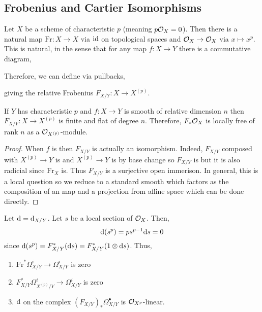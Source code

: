 \documentclass[12pt]{article}
\begin{document}
\subsection{Frobenius and Cartier Isomorphisms}

\newcommand{\Fr}{\mathrm{Fr}}

\begin{defn}
Let $X$ be a scheme of characteristic $p$ (meaning $p \mathcal{O}_{X} = 0$). Then there is a natural map $\Fr : X \to X$ via $\mathrm{id}$ on topological spaces and $\mathcal{O}_{X} \to \mathcal{O}_{X}$ via $x \mapsto x^p$. This is natural, in the sense that for any map $f : X \to Y$ there is a commutative diagram,
\begin{center}
\end{center}
Therefore, we can define via pullbacks,
\begin{center}
\end{center}
giving the relative Frobenius $F_{X/Y} : X \to X^{(p)}$. 
\end{defn}

\begin{prop}
If $Y$ has characteristic $p$ and $f : X \to Y$ is smooth of relative dimension $n$ then $F_{X/Y} : X \to X^{(p)}$ is finite and flat of degree $n$. Therefore, $F_* \mathcal{O}_{X}$ is locally free of rank $n$ as a $\mathcal{O}_{X^{(p)}}$-module.
\end{prop}

\begin{proof}
When $f$ is \etale then $F_{X/Y}$ is actually an isomorphism. Indeed, $F_{X/Y}$ composed with $X^{(p)} \to Y$ is \etale and $X^{(p)} \to Y$ is \etale by base change so $F_{X/Y}$ is \etale but it is also radicial since $\Fr_X$ is. Thus $F_{X/Y}$ is a surjective open immerison. In general, this is a local question so we reduce to a standard smooth which factors as the composition of an \etale map and a projection from affine space which can be done directly.
\end{proof}

\begin{prop}
Let $\mathrm{d} = \mathrm{d}_{X/Y}$. Let $s$ be a local section of $\mathcal{O}_{X}$. Then,
\[ \mathrm{d}{(s^p)} = p s^{p-1} \mathrm{d}{s} = 0 \]
since $\mathrm{d}{(s^p)} = F_{X/Y}^*(\mathrm{d}{s}) = F^*_{X/Y}(1 \otimes \mathrm{d}{s})$. Thus,
\begin{enumerate}
\item $\Fr^* \Omega^i_{X/Y} \to \Omega_{X/Y}^i$ is zero
\item $F^*_{X/Y} \Omega^i_{X^{(p)}/Y} \to \Omega^i_{X/Y}$ is zero
\item $\mathrm{d}$ on the complex $(F_{X/Y})_* \Omega^\bullet_{X/Y}$ is $\mathcal{O}_{X^p}$-linear.
\end{enumerate}
\end{prop}
\end{document}
